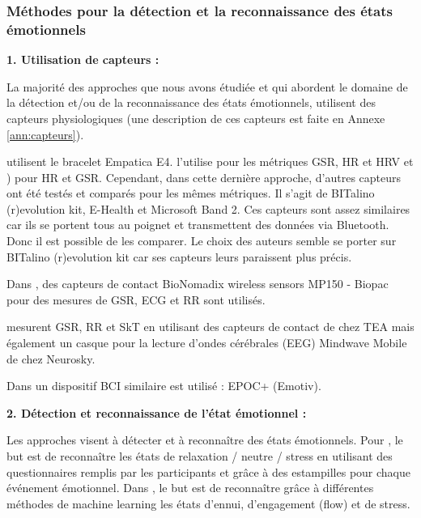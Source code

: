 \documentclass[11pt]{article}
\begin{document}
		\subsubsection{Méthodes pour la détection et la reconnaissance des états émotionnels}\label{sec:etatemotionnel}
			\textbf{1. Utilisation de capteurs :}\par
            La majorité des approches que nous avons étudiée et qui abordent le domaine de la détection et/ou de la reconnaissance des états émotionnels, utilisent des capteurs physiologiques (une description de ces capteurs est faite en Annexe \ref{ann:capteurs}).\par
            \cite{maier_et_al._2019,nalepa_et_al._2017,gizycka_et_al._2018} utilisent le bracelet Empatica E4.
            \cite{maier_et_al._2019} l'utilise pour les métriques GSR, HR et HRV et \cite{nalepa_et_al._2017,gizycka_et_al._2018}) pour HR et GSR. 
            Cependant, dans cette dernière approche, d'autres capteurs ont été testés et comparés pour les mêmes métriques. Il s'agit de BITalino (r)evolution kit, E-Health et Microsoft Band 2. 
            Ces capteurs sont assez similaires car ils se portent tous au poignet et transmettent des données via Bluetooth.
            Donc il est possible de les comparer.
            Le choix des auteurs semble se porter sur BITalino (r)evolution kit car ses capteurs leurs paraissent plus précis.\par
            Dans \cite{yang_et_al._2018}, des capteurs de contact BioNomadix wireless sensors MP150 - Biopac pour des mesures de GSR, ECG et RR sont utilisés.\par
            \cite{gal_2019,gal_et_al._2020} mesurent GSR, RR et SkT en utilisant des capteurs de contact de chez TEA mais également un casque pour la lecture d'ondes cérébrales (EEG) Mindwave Mobile de chez Neurosky.\par
            Dans \cite{carofiglio_et_al._2019} un dispositif BCI similaire est utilisé : EPOC+ (Emotiv).\par 
            \vspace*{0.6cm}
        	\textbf{2. Détection et reconnaissance de l'état émotionnel :}\par
            Les approches visent à détecter et à reconnaître des états émotionnels. Pour \cite{nalepa_et_al._2017,gizycka_et_al._2018}, le but est de reconnaître les états de relaxation / neutre / stress en utilisant des questionnaires remplis par les participants et grâce à des estampilles pour chaque événement émotionnel. 
            Dans \cite{carofiglio_et_al._2019}, le but est de reconnaître grâce à différentes méthodes de machine learning les états d'ennui, d'engagement (flow) et de stress. 
\end{document}
